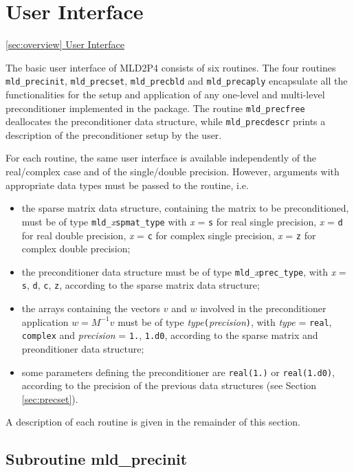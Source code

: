 \section{User Interface\label{sec:highlevel}}
         {\underline{\ref{sec:overview} User Interface}}

The basic user interface of MLD2P4 consists of six routines. The four routines \verb|mld_precinit|,
\verb|mld_precset|, \verb|mld_precbld| and \verb|mld_precaply| encapsulate all the functionalities
for the setup and application of any one-level and multi-level preconditioner implemented in the package.
The routine \verb|mld_precfree| deallocates the preconditioner data structure, while \verb|mld_precdescr|
prints a description of the preconditioner setup by the user.

For each routine, the same user interface is available independently of the real/complex case
and of the single/double precision. However, arguments with appropriate data types must
be passed to the routine, i.e.\
\begin{itemize}
\item the sparse matrix data structure, containing the matrix to be preconditioned, must be of type
	\verb|mld_|\emph{x}\verb|spmat_type|
	with \emph{x} = \verb|s| for real single precision, \emph{x} = \verb|d| for real double precision,
	\emph{x} = \verb|c| for complex single precision, \emph{x} = \verb|z| for complex double precision;
\item the preconditioner data structure must be of type \verb|mld_|\emph{x}\verb|prec_type|, with \emph{x} =    
  \verb|s|, \verb|d|, \verb|c|, \verb|z|, according to the sparse matrix data structure;
\item the arrays containing the vectors $v$ and $w$ involved in the preconditioner application $w=M^{-1}v$
  must be of type \emph{type}\verb|(|\emph{precision}\verb|)|, with \emph{type} = \verb|real|, \verb|complex| and
  \emph{precision} = \verb|1.|, \verb|1.d0|, according to the sparse matrix and preonditioner data structure;
\item some parameters defining the preconditioner are \verb|real(1.)| or \verb|real(1.d0)|, according
  to the precision of the previous data structures (see Section \ref{sec:precset}).
\end{itemize}
A description of each routine is given in the remainder of this section.


\subsection{Subroutine mld\_precinit\label{sec:precinit}}

